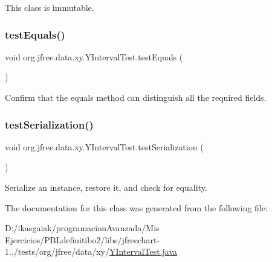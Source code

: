 This class is immutable. \mbox{\label{classorg_1_1jfree_1_1data_1_1xy_1_1_y_interval_test_a8a1198c88bec21a6758a210137424ac5}} 
\subsubsection{\texorpdfstring{test\+Equals()}{testEquals()}}
{\footnotesize\ttfamily void org.\+jfree.\+data.\+xy.\+Y\+Interval\+Test.\+test\+Equals (\begin{DoxyParamCaption}{ }\end{DoxyParamCaption})}

Confirm that the equals method can distinguish all the required fields. \mbox{\label{classorg_1_1jfree_1_1data_1_1xy_1_1_y_interval_test_a86ce63ab3b15486cbd9eff7ee7436f77}} 
\subsubsection{\texorpdfstring{test\+Serialization()}{testSerialization()}}
{\footnotesize\ttfamily void org.\+jfree.\+data.\+xy.\+Y\+Interval\+Test.\+test\+Serialization (\begin{DoxyParamCaption}{ }\end{DoxyParamCaption})}

Serialize an instance, restore it, and check for equality. 

The documentation for this class was generated from the following file\+:\begin{DoxyCompactItemize}
\item 
D\+:/ikasgaiak/programacion\+Avanzada/\+Mis Ejercicios/\+P\+B\+Ldefinitibo2/libs/jfreechart-\/1../tests/org/jfree/data/xy/\mbox{\hyperlink{_y_interval_test_8java}{Y\+Interval\+Test.\+java}}\end{DoxyCompactItemize}
